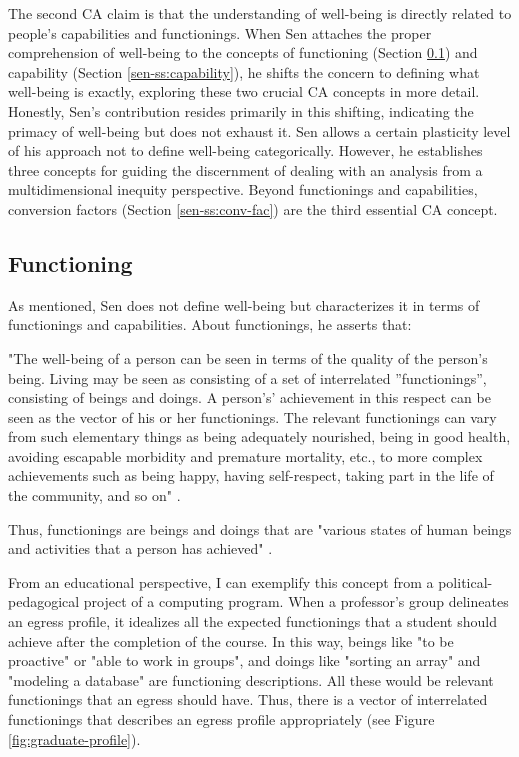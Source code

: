 The second \gls{CA} claim is that the understanding of well-being is directly related to people's capabilities and functionings. When Sen attaches the proper comprehension of well-being to the concepts of functioning (Section \ref{sen-ss:functioning}) and capability (Section \ref{sen-ss:capability}), he shifts the concern to defining what well-being is exactly, exploring these two crucial \gls{CA} concepts in more detail. Honestly, Sen's contribution resides primarily in this shifting, indicating the primacy of well-being but does not exhaust it. Sen allows a certain plasticity level of his approach not to define well-being categorically. However, he establishes three concepts for guiding the discernment of dealing with an analysis from a multidimensional inequity perspective. Beyond functionings and capabilities, conversion factors (Section \ref{sen-ss:conv-fac}) are the third essential \gls{CA} concept.

\subsection{Functioning}
\label{sen-ss:functioning}

As mentioned, Sen does not define well-being but characterizes it in terms of functionings and capabilities. About functionings, he asserts that:
\begin{citacao}
    "The well-being of a person can be seen in terms of the quality of the person's being. Living may be seen as consisting of a set of interrelated ''functionings'', consisting of beings and doings. A person's' achievement in this respect can be seen as the vector of his or her functionings. The relevant functionings can vary from such elementary things as being adequately nourished, being in good health, avoiding escapable morbidity and premature mortality, etc., to more complex achievements such as being happy, having self-respect, taking part in the life of the community, and so on" \cite[p.~39]{sen:1992}.
\end{citacao}
Thus, functionings are beings and doings that are "various states of human beings and activities that a person has achieved" \cite{robeyns:2023}.

From an educational perspective, I can exemplify this concept from a political-pedagogical project of a computing program. When a professor's group delineates an egress profile, it idealizes all the expected functionings that a student should achieve after the completion of the course. In this way, beings like "to be proactive" or "able to work in groups", and doings like "sorting an array" and "modeling a database" are functioning descriptions. All these would be relevant functionings that an egress should have. Thus, there is a vector of interrelated functionings that describes an egress profile appropriately (see Figure \ref{fig:graduate-profile}).

